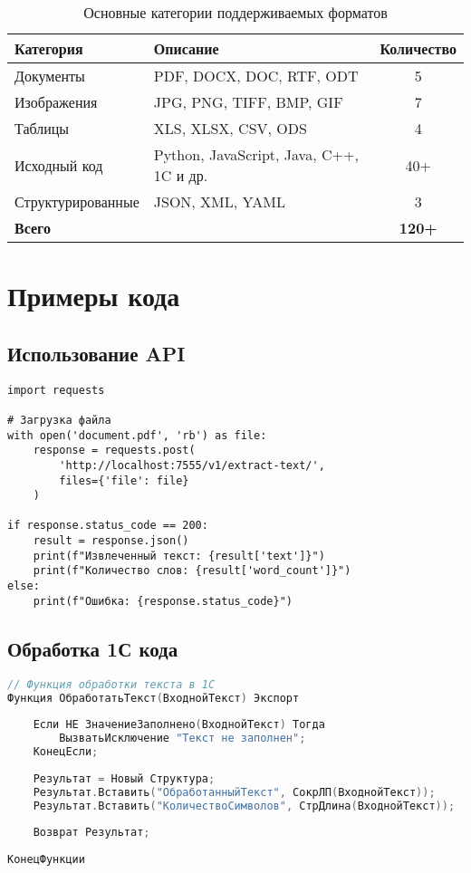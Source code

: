 \documentclass[12pt,a4paper]{article}
\begin{document}
\begin{table}[htbp]
\centering
\caption{Основные категории поддерживаемых форматов}
\begin{tabularx}{\textwidth}{|l|X|c|}
\hline
\textbf{Категория} & \textbf{Описание} & \textbf{Количество} \\
\hline
Документы & PDF, DOCX, DOC, RTF, ODT & 5 \\
Изображения & JPG, PNG, TIFF, BMP, GIF & 7 \\
Таблицы & XLS, XLSX, CSV, ODS & 4 \\
Исходный код & Python, JavaScript, Java, C++, 1C и др. & 40+ \\
Структурированные & JSON, XML, YAML & 3 \\
\hline
\textbf{Всего} & & \textbf{120+} \\
\hline
\end{tabularx}
\label{tab:formats}
\end{table}

\section{Примеры кода}

\subsection{Использование API}

\begin{lstlisting}[caption=Пример запроса к API на Python]
import requests

# Загрузка файла
with open('document.pdf', 'rb') as file:
    response = requests.post(
        'http://localhost:7555/v1/extract-text/',
        files={'file': file}
    )

if response.status_code == 200:
    result = response.json()
    print(f"Извлеченный текст: {result['text']}")
    print(f"Количество слов: {result['word_count']}")
else:
    print(f"Ошибка: {response.status_code}")
\end{lstlisting}

\subsection{Обработка 1С кода}

\begin{lstlisting}[language=C, caption=Пример кода 1С:Предприятие]
// Функция обработки текста в 1С
Функция ОбработатьТекст(ВходнойТекст) Экспорт
    
    Если НЕ ЗначениеЗаполнено(ВходнойТекст) Тогда
        ВызватьИсключение "Текст не заполнен";
    КонецЕсли;
    
    Результат = Новый Структура;
    Результат.Вставить("ОбработанныйТекст", СокрЛП(ВходнойТекст));
    Результат.Вставить("КоличествоСимволов", СтрДлина(ВходнойТекст));
    
    Возврат Результат;
    
КонецФункции
\end{lstlisting}
\end{document}
